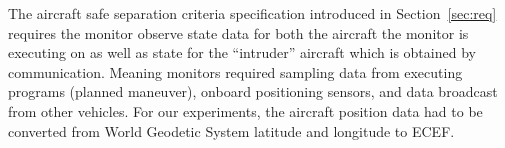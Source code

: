  The aircraft safe separation criteria specification introduced in
  Section~\ref{sec:req} requires the monitor observe state data for
  both the aircraft the monitor is executing on as well as state for
  the ``intruder'' aircraft which is obtained by
  communication.  Meaning monitors required sampling data from
  executing programs (planned maneuver), onboard positioning sensors,
  and data broadcast from other vehicles.  For our experiments, the
  aircraft  position data  had
  to be converted from World Geodetic System latitude and longitude to
  ECEF. 

  

